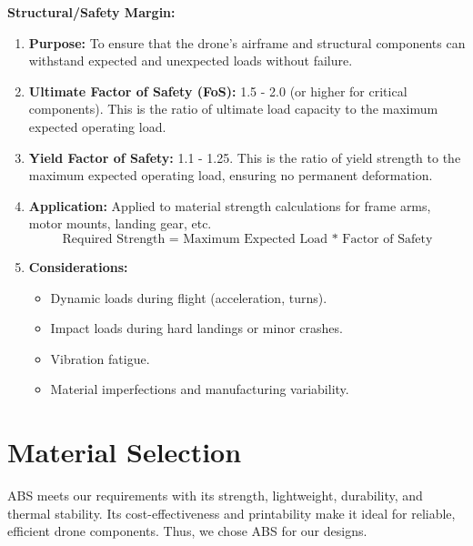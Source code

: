 \documentclass[12pt]{report}
\begin{document}
        \noindent \textbf{\large Structural/Safety Margin:} \\
        \begin{enumerate}
          \item \textbf{Purpose:} To ensure that the drone's airframe and structural components can withstand expected and unexpected loads without failure.
          \item \textbf{Ultimate Factor of Safety (FoS):} 1.5 - 2.0 (or higher for critical components). This is the ratio of ultimate load capacity to the maximum expected operating load.
          \item \textbf{Yield Factor of Safety:} 1.1 - 1.25. This is the ratio of yield strength to the maximum expected operating load, ensuring no permanent deformation.
          \item \textbf{Application:} Applied to material strength calculations for frame arms, motor mounts, landing gear, etc. \[ \text{Required Strength = Maximum Expected Load * Factor of Safety} \]
          \item \textbf{Considerations:}
            \begin{itemize}
              \item Dynamic loads during flight (acceleration, turns).
              \item Impact loads during hard landings or minor crashes.
              \item Vibration fatigue.
              \item Material imperfections and manufacturing variability.
            \end{itemize}
        \end{enumerate}

        
\newpage
    \section{Material Selection}
      ABS meets our requirements with its strength, lightweight, durability, and thermal stability. Its cost-effectiveness and printability make it ideal for reliable, efficient drone components. Thus, we chose ABS for our designs.



\end{document}
